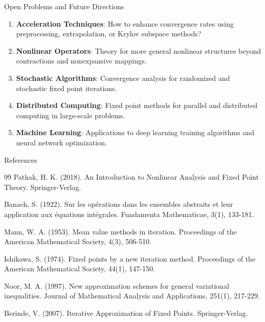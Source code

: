 \documentclass[aspectratio=169,10pt]{beamer}
\begin{document}
\begin{frame}{Open Problems and Future Directions}
  \begin{enumerate}
    \item \textbf{Acceleration Techniques}: How to enhance convergence rates
          using preprocessing, extrapolation, or Krylov subspace methods?

    \vspace{0.3cm}

    \item \textbf{Nonlinear Operators}: Theory for more general nonlinear structures
          beyond contractions and nonexpansive mappings.

    \vspace{0.3cm}

    \item \textbf{Stochastic Algorithms}: Convergence analysis for randomized
          and stochastic fixed point iterations.

    \vspace{0.3cm}

    \item \textbf{Distributed Computing}: Fixed point methods for parallel and
          distributed computing in large-scale problems.

    \vspace{0.3cm}

    \item \textbf{Machine Learning}: Applications to deep learning training
          algorithms and neural network optimization.
  \end{enumerate}
\end{frame}

\begin{frame}[allowframebreaks]{References}
  \small
  \begin{thebibliography}{99}
    Pathak, H. K. (2018). An Introduction to Nonlinear Analysis and Fixed Point Theory.
    Springer-Verlag.

    Banach, S. (1922). Sur les opérations dans les ensembles abstraits et leur application aux équations intégrales.
    Fundamenta Mathematicae, 3(1), 133-181.

    Mann, W. A. (1953). Mean value methods in iteration.
    Proceedings of the American Mathematical Society, 4(3), 506-510.

    Ishikawa, S. (1974). Fixed points by a new iteration method.
    Proceedings of the American Mathematical Society, 44(1), 147-150.

    Noor, M. A. (1997). New approximation schemes for general variational inequalities.
    Journal of Mathematical Analysis and Applications, 251(1), 217-229.

    Berinde, V. (2007). Iterative Approximation of Fixed Points.
    Springer-Verlag.
  \end{thebibliography}
\end{frame}
\end{document}
